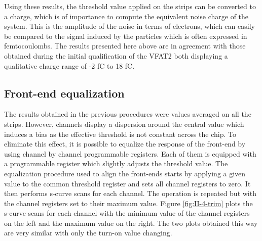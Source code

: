       Using these results, the threshold value applied on the strips can be converted to a charge, which is of importance to compute the equivalent noise charge of the system. This is the amplitude of the noise in terms of electrons, which can easily be compared to the signal induced by the particles which is often expressed in femtocoulombs. The results presented here above are in agreement with those obtained during the initial qualification of the VFAT2 \cite{Aspell:1267947} both displaying a qualitative charge range of -2 fC to 18 fC.

    \subsection{Front-end equalization}

      The results obtained in the previous procedures were values averaged on all the strips. However, channels display a dispersion around the central value which induces a bias as the effective threshold is not constant across the chip. To eliminate this effect, it is possible to equalize the response of the front-end by using channel by channel programmable registers. Each of them is equipped with a programmable register which slightly adjusts the threshold value. The equalization procedure used to align the front-ends starts by applying a given value to the common threshold register and sets all channel registers to zero. It then performs s-curve scans for each channel. The operation is repeated but with the channel registers set to their maximum value. Figure \ref{fig:II-4-trim} plots the s-curve scans for each channel with the minimum value of the channel registers on the left and the maximum value on the right. The two plots obtained this way are very similar with only the turn-on value changing. \\

